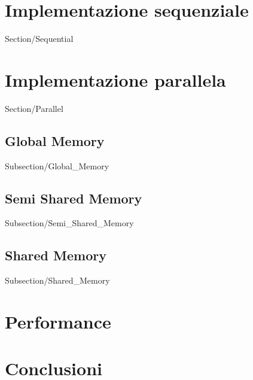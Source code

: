 \documentclass[12pt,a4paper,titlepage]{article}
\begin{document}
\newpage
\section{Implementazione sequenziale}
 {Section/Sequential}

\newpage
\section{Implementazione parallela}
 {Section/Parallel}

\subsection{Global Memory}
 {Subsection/Global_Memory}

\subsection{Semi Shared Memory}
 {Subsection/Semi_Shared_Memory}	

\subsection{Shared Memory}
 {Subsection/Shared_Memory}

\newpage
\section{Performance}


\newpage
\section{Conclusioni}


\newpage

\nocite{*}
\printbibliography
\end{document}
